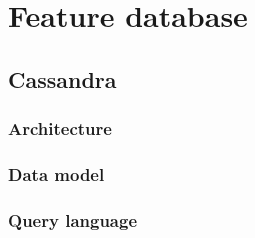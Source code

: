 \section{Feature database}

\subsection{Cassandra}



\subsubsection{Architecture}


\subsubsection{Data model}


\subsubsection{Query language}